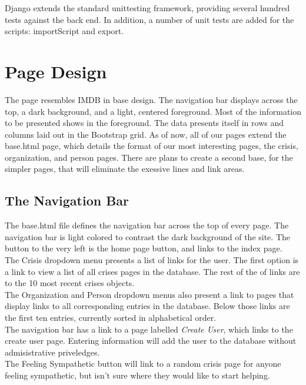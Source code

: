 \documentclass[12pt]{report}
\begin{document}
Django extends the standard unittesting framework, providing several hundred tests against the back end.
In addition, a number of unit tests are added for the scripts: importScript and export.


\newpage
\section*{Page Design}
\hfill


The page resembles IMDB in base design.
The navigation bar displays across the top, a dark background, and a light, centered foreground.
Most of the information to be presented shows in the foreground.
The data presents itself in rows and columns laid out in the Bootstrap grid.
As of now, all of our pages extend the base.html page,
which details the format of our most interesting pages, the crisis, organization, and person pages.
There are plans to create a second base, for the simpler pages, that will eliminate the exessive
lines and link areas.
\\


\subsection*{The Navigation Bar}
\hfill

The base.html file defines the navigation bar across the top of every page.
The navigation bar is light colored to contrast the dark background of the site.
The button to the very left is the home page button, and links to the index page.
\\


The Crisis dropdown menu presents a list of links for the user.
The first option is a link to view a list of all crises pages in the database.
The rest of the of links are to the 10 most recent crises objects.
\\


The Organization and Person dropdown menus also present a link to pages
that display links to all corresponding entries in the database.
Below those links are the first ten entries, currently sorted in alphabetical order.
\\


The navigation bar has a link to a page labelled \emph{Create User}, which links to the
create user page.  Entering information will add the user to the database without
admisistrative priveledges.
\\


The Feeling Sympathetic button will link to a random crisis page for anyone feeling sympathetic,
but isn't sure where they would like to start helping.
\\
\end{document}
